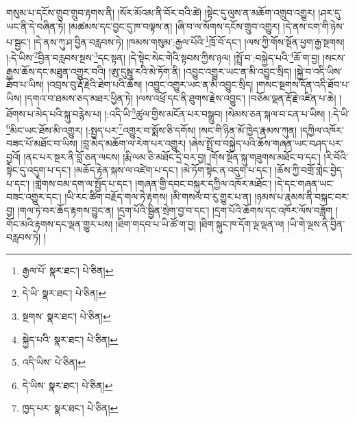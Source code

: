 གསུམ་པ་དངོས་གྲུབ་གྲུབ་རྟགས་ནི། །སོར་མོའམ་ནི་བོར་བའི་ཚེ། །སྟེང་དུ་ལུས་ན་མཆོག་འགྲུབ་འགྱུར། །ཤར་དུ་ཡང་ནི་དེ་བཞིན་ཏེ། །མཚམས་དང་བྱང་དུ་ཁ་བལྟས་ན། །ཞི་བ་ལ་སོགས་དངོས་གྲུབ་འགྱུར། །དེ་ནས་ངག་གི་ཉེས་པ་སྦྱང་། །དེ་ནས་ཀུ་ཤ་བྱིན་བརླབས་ཏེ། །ཁམས་གསུམ་:རྒྱལ་པོའི་\footnote{རྒྱལ་པོ་  སྣར་ཐང་།  པེ་ཅིན། }ཁྲོ་བོ་དང་། །ལས་ཀྱི་གོས་སྔོན་ཕྱག་རྒྱ་སྔགས། །:དེ་ཡིས་\footnote{དེ་ཡི་  སྣར་ཐང་།  པེ་ཅིན། }བྱིན་བརླབས་སྔས་\footnote{སྔགས་  སྣར་ཐང་།  པེ་ཅིན། }དང་སྟན། །དེ་སྟེང་སེང་གེའི་སྟབས་ཀྱིས་ཉལ། །སྤྲོ་བ་:བསྐྱེད་པའི་\footnote{སྐྱེད་པའི་  སྣར་ཐང་།  པེ་ཅིན། }ཆོ་ག་བྱ། །སངས་རྒྱས་ཆོས་དང་མཐུན་འགྱུར་བའི། །ཨུ་དུམྦཱ་རའི་མེ་ཏོག་ནི། །འབྱུང་འགྱུར་ཡང་ན་མི་འབྱུང་སྲིད། །སྐྱེ་བ་འདི་ཡིས་ཐོབ་པ་ཡིས། །འབྲས་བུ་རྡོ་རྗེའི་ཐེག་པའི་ཆོས། །འབྱུང་འགྱུར་ཡང་ན་མི་འབྱུང་སྲིད། །གསང་སྔགས་དོན་འདི་ཐོབ་པ་ཡིས། །དགའ་བ་ཐམས་ཅད་མཐར་ཕྱིན་ཏེ། །ལས་འཕྲོ་དང་ནི་ཐུགས་རྗེས་འབྱུང་། །བཅོམ་ལྡན་རྡོ་རྗེ་འཛིན་པ་ཆེ། །ཐོགས་པ་མེད་པའི་སྐུ་བརྙེས་པ། །:འདི་ཡི་\footnote{འདི་ཡིས་  པེ་ཅིན། }ཚུལ་གྱིས་མངོན་པར་བསྒྲུབ། །སེམས་ཅན་སྐལ་བ་ངན་པ་ཡིས། །:དེ་ཡི་\footnote{དེ་ཡིས་  སྣར་ཐང་།  པེ་ཅིན། }མིང་ཡང་ཐོས་མི་འགྱུར། །:སྤྱད་པར་\footnote{ཁྱད་པར་  སྣར་ཐང་།  པེ་ཅིན། }འགྱུར་བ་སྨོས་ཅི་དགོས། །སང་གི་ཉིན་མོ་ཁྱེད་རྣམས་ཀུན། །དཀྱིལ་འཁོར་བཟང་པོ་མཐོང་བ་ཡིས། །བླ་མེད་མཆོག་ལ་རེག་པར་འགྱུར། །ཞེས་སྤྲོ་བ་བསྐྱེད་པའི་ཆོས་གཞན་ཡང་བཤད་པར་བྱའོ། །ནང་པར་སྔར་ནི་བློ་ཅན་ལངས། །རྨི་ལམ་ཅི་མཐོང་དྲི་བར་བྱ། །གོས་སྔོན་སྐུ་གཟུགས་མཐོང་བ་དང་། །རི་བོའི་སྟེང་དུ་འདུག་པ་དང་། །མཆོད་རྟེན་སྐས་ལ་འཛེག་པ་དང་། །མེ་ཏོག་སྟེང་ན་འདུག་པ་དང་། །ཆོས་ཀྱི་བགྲོ་གླེང་བྱེད་པ་དང་། །གླེགས་བམ་དག་ལ་སྤྱོད་པ་དང་། །གཞན་གྱི་དབང་བསྐུར་དཀྱིལ་འཁོར་མཐོང་། །དེ་དང་གཞན་ཡང་བཟང་འགྱུར་དང་། །ཡི་རང་ཚིག་བརྗོད་གལ་ཏེ་རྟགས། །མི་གསལ་བ་རུ་གྱུར་པ་ན། །ཉམས་པ་རྣམས་ནི་བསྐང་བར་བྱ། །གལ་ཏེ་བར་ཆོད་རྟགས་བྱུང་ན། །དྲག་པོའི་སྦྱིན་སྲེག་བྱ་བ་དང་། །དྲག་པོའི་ཆོགས་དང་འཁོར་ལོས་བཟློག །གོང་མའི་རྟགས་དང་ལྡན་གྱུར་པས། །ཐིག་གདབ་པ་ཡི་ཚོ་ག་བྱ། །ཐིག་སྐུང་ཁ་དོག་ལྔ་ལྡན་ལ། །ཡི་གེ་ལྔས་ནི་བྱིན་བརླབས་ཏེ། །
